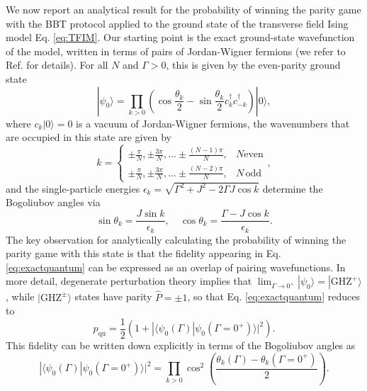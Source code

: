 \documentclass[prb,twocolumn,showpacs,amssymb,superscriptaddress]{revtex4-2}
\begin{document}
We now report an analytical result for the probability of winning the parity game with the BBT protocol applied to the ground state of the transverse field Ising model Eq. \eqref{eq:TFIM}. Our starting point is the exact ground-state wavefunction of the model, written in terms of pairs of Jordan-Wigner fermions (we refer to Ref.  for details). For all $N$ and $\Gamma>0$, this is given by the even-parity ground state
\begin{equation}
|\psi_0 \rangle = \prod_{k>0} \left(\cos{\frac{\theta_k}{2}} - \sin{\frac{\theta_k}{2}}c_k^\dagger c_{-k}^\dagger \right) |0\rangle,
\end{equation}
where $c_k|0\rangle = 0$ is a vacuum of Jordan-Wigner fermions, the wavenumbers that are occupied in this state are given by
\begin{equation}
k = \begin{cases} \pm \frac{\pi}{N}, \pm \frac{3\pi}{N}, \ldots \pm \frac{(N-1)\pi}{N},  & N \mathrm{even} \\ 
\pm \frac{\pi}{N}, \pm \frac{3\pi}{N}, \ldots \pm \frac{(N-2)\pi}{N}, & N \, \mathrm{odd}\end{cases},
\end{equation}
and the single-particle energies $\epsilon_k = \sqrt{\Gamma^2+J^2-2\Gamma J \cos{k}}$ determine the Bogoliubov angles via
\begin{equation}
\label{eq:bog}
\sin{\theta_k} = \frac{J \sin{k}}{\epsilon_k}, \quad \cos{\theta_k} = \frac{\Gamma-J \cos{k}}{\epsilon_k}.
\end{equation}
The key observation for analytically calculating the probability of winning the parity game with this state is that the fidelity appearing in Eq. \eqref{eq:exactquantum} can be expressed as an overlap of pairing wavefunctions. In more detail, degenerate perturbation theory implies that $\lim_{\Gamma\to 0^+} |\psi_0\rangle = |\mathrm{GHZ}^+\rangle$, while $|\mathrm{GHZ}^{\pm}\rangle$ states have parity $\hat{P} = \pm 1$, so that Eq. \eqref{eq:exactquantum} reduces to
\begin{equation}
p_{\mathrm{qu}} = \frac{1}{2}\left(1+|\langle \psi_0(\Gamma)|\psi_0(\Gamma=0^+)\rangle|^2\right).
\end{equation}
This fidelity can be written down explicitly in terms of the Bogoliubov angles as
\begin{equation}
|\langle \psi_0(\Gamma)|\psi_0(\Gamma=0^+)\rangle|^2 = \prod_{k>0} \cos^2{\left(\frac{\theta_k(\Gamma) - \theta_k(\Gamma=0^+)}{2}\right)}.
\end{equation}
\end{document}
